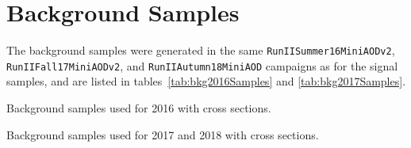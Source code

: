 \section{Background Samples}
The background samples were generated in the same \texttt{RunIISummer16MiniAODv2}, \texttt{RunIIFall17MiniAODv2}, and \texttt{RunIIAutumn18MiniAOD} campaigns as for the signal samples, and are listed in tables~\ref{tab:bkg2016Samples} and \ref{tab:bkg2017Samples}.

\begin{table}[htbp]
  \centering
  
  \caption{
    Background samples used for 2016 with cross sections.
  }
  \label{tab:bkg2016Samples}
\end{table}

\begin{table}[htbp]
  \centering
  
  \caption{
    Background samples used for 2017 and 2018 with cross sections.
  }
  \label{tab:bkg2017Samples}
\end{table}
